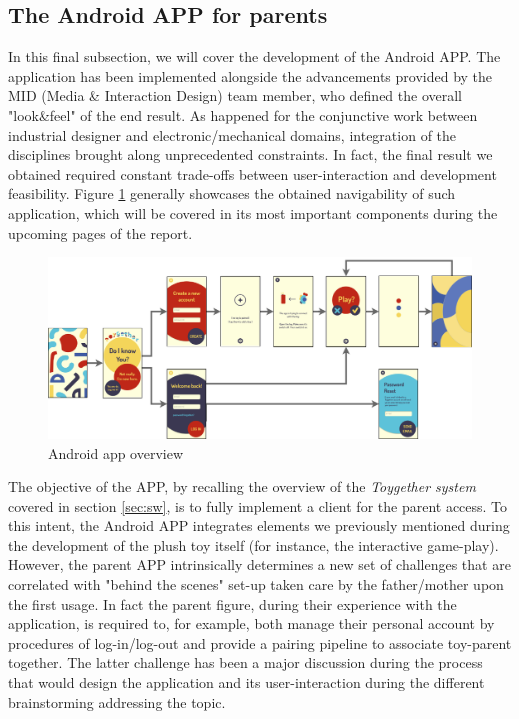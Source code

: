 \newpage
\subsection{The Android APP for parents}
\label{subsec:android} 

In this final subsection, we will cover the development of the Android APP. The application has been implemented alongside the advancements provided by the MID (Media \& Interaction Design) team member, who defined the overall "look\&feel" of the end result. As happened for the conjunctive work between industrial designer and electronic/mechanical domains, integration of the disciplines brought along unprecedented constraints. In fact, the final result we obtained required constant trade-offs between user-interaction and development feasibility. Figure \ref{fig:SE_android_overview} generally showcases the obtained navigability of such application, which will be covered in its most important components during the upcoming pages of the report.

\begin{figure}[ht]
    \centering
    \includegraphics[scale=0.4]{images/SE_android_overview.png}
    \caption{Android app overview}
    \label{fig:SE_android_overview}
\end{figure}

\medskip
The objective of the APP, by recalling the overview of the \textit{Toygether system} covered in section \ref{sec:sw}, is to fully implement a client for the parent access. To this intent, the Android APP integrates elements we previously mentioned during the development of the plush toy itself (for instance, the interactive game-play). However, the parent APP intrinsically determines a new set of challenges that are correlated with "behind the scenes" set-up taken care by the father/mother upon the first usage. In fact the parent figure, during their experience with the application, is required to, for example, both manage their personal account by procedures of log-in/log-out and provide a pairing pipeline to associate toy-parent together. The latter challenge has been a major discussion during the process that would design the application and its user-interaction during the different brainstorming addressing the topic.

